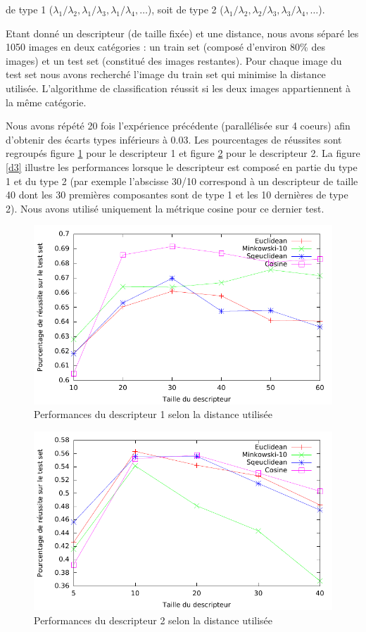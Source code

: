 \documentclass[a4paper,10pt]{article} %
\theoremstyle{definition} %
\begin{document}
 de type 1 ($\lambda_1/\lambda_2, \lambda_1/\lambda_3, \lambda_1/\lambda_4, \dots$), soit de type 2 ($\lambda_1/\lambda_2, \lambda_2/\lambda_3, \lambda_3/\lambda_4, \dots$).

Etant donné un descripteur (de taille fixée) et une distance, nous avons séparé les 1050 images en deux catégories : un train set (composé d'environ 80\% des images) et un test set (constitué des images restantes). Pour chaque image du test set nous avons recherché l'image du train set qui minimise la distance utilisée. L'algorithme de classification réussit si les deux images appartiennent à la même catégorie.

Nous avons répété 20 fois l'expérience précédente (parallélisée sur 4 coeurs) afin d'obtenir des écarts types inférieurs à 0.03. Les pourcentages de réussites sont regroupés figure \ref{d1} pour le descripteur 1 et figure \ref{d2} pour le descripteur 2. La figure \ref{d3} illustre les performances lorsque le descripteur est composé en partie du type 1 et du type 2 (par exemple l'abscisse 30/10 correspond à un descripteur de taille 40 dont les 30 premières composantes sont de type 1 et les 10 dernières de type 2). Nous avons utilisé uniquement la métrique cosine pour ce dernier test.

\begin{figure}[H]
  \includegraphics[scale=1.15]{../plot/courbe1.pdf}
\caption{Performances du descripteur 1 selon la distance utilisée}
\label{d1}
\end{figure}

\begin{figure}[H]
  \includegraphics[scale=1.15]{../plot/courbe2.pdf}
\caption{Performances du descripteur 2 selon la distance utilisée}
\label{d2}
\end{figure}
\end{document}
